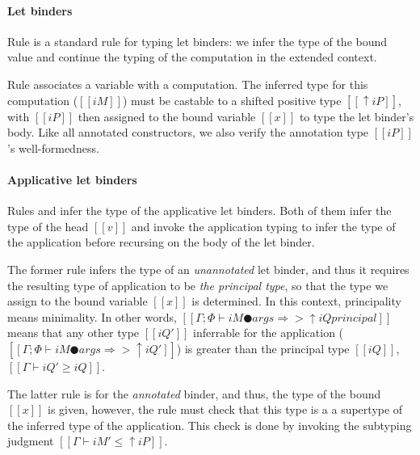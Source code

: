 \paragraph*{Let binders}
  Rule  is a standard rule for typing let
  binders: we infer the type of the bound value and continue the typing of the
  computation in the extended context.

  Rule  associates a variable with a computation.
  The inferred type for this computation ($[[iM]]$) must be castable to a
  shifted positive type $[[↑iP]]$, with $[[iP]]$ then assigned to the bound
  variable $[[x]]$ to type the let binder's body. Like all annotated
  constructors, we also verify the annotation type $[[iP]]$'s well-formedness. 
  
\paragraph*{Applicative let binders}
  Rules  and 
  infer the type of the applicative let binders.
  Both of them infer the type of the head $[[v]]$ 
  and invoke the application typing to infer the type of the application 
  before recursing on the body of the let binder.

  The former rule infers the type of an \emph{unannotated} let binder, and thus
  it requires the resulting type of application to be \emph{the principal type},
  so that the type we assign to the bound variable $[[x]]$ is determined.
  In this context, principality means minimality. In other words, 
  $[[Γ ; Φ ⊢ iM ● args ⇒> ↑iQ principal]]$ means that
  any other type $[[iQ']]$ inferrable for the application (\ie $[[Γ ; Φ ⊢ iM ● args ⇒> ↑iQ']]$)
  is greater than the principal type $[[iQ]]$, \ie $[[Γ ⊢ iQ' ≥ iQ]]$.

  The latter rule is for the \emph{annotated} binder,
  and thus, the type of the bound $[[x]]$ is given, 
  however, the rule must check that this type is a
  a supertype of the inferred type of the application. 
  This check is done by invoking the subtyping judgment
  $[[Γ ⊢ iM' ≤ ↑iP]]$.

